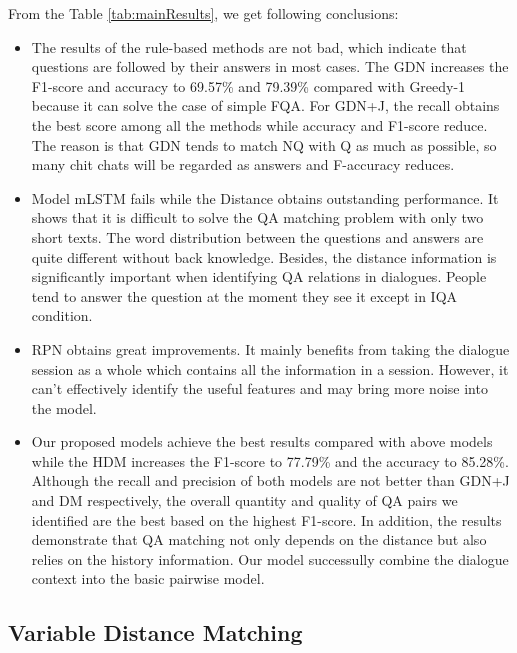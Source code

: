 From the Table \ref{tab:mainResults}, we get following conclusions:
\begin{itemize}
	
	\item The results of the rule-based methods are not bad, which indicate that questions are followed by their answers in most cases. The GDN increases the F1-score and accuracy to 69.57\% and 79.39\% compared with Greedy-1 because it can solve the case of simple FQA. For GDN+J, the recall obtains the best score among all the methods while accuracy and F1-score reduce. The reason is that GDN tends to match NQ with Q as much as possible, so many chit chats will be regarded as answers and F-accuracy reduces.
	
	\item Model mLSTM fails while the Distance obtains outstanding performance. It shows that it is difficult to solve the QA matching problem with only two short texts. The word distribution between the questions and answers are quite different without back knowledge. Besides, the distance information is significantly important when identifying QA relations in dialogues. People tend to answer the question at the moment they see it except in IQA condition.
	
	\item RPN obtains great improvements. It mainly benefits from taking the dialogue session as a whole which contains all the information in a session. However, it can't effectively identify the useful features and may bring more noise into the model. 
	
	\item Our proposed models achieve the best results compared with above models while the HDM increases the F1-score to 77.79\% and the accuracy to 85.28\%. Although the recall and precision of both models are not better than GDN+J and DM respectively, the overall quantity and quality of QA pairs we identified are the best based on the highest F1-score. In addition, the results demonstrate that QA matching not only depends on the distance but also relies on the history information. Our model successully combine the dialogue context into the basic pairwise model.
	
\end{itemize}



\subsection{Variable Distance Matching}

